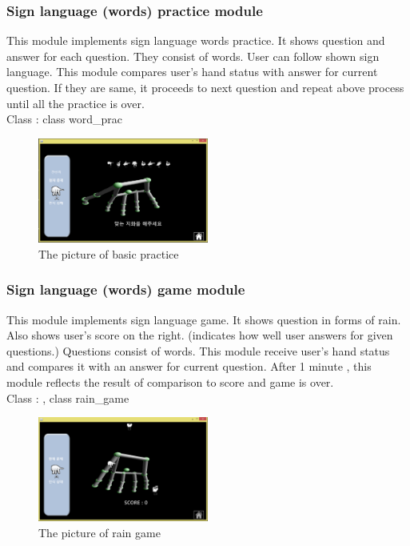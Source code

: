 \documentclass[10pt,journal,compsoc]{IEEEtran}
\begin{document}
\subsubsection{ Sign language (words) practice module\\}
This module implements sign language words practice. It shows question and answer for each question. They consist of words. User can follow shown sign language.  This module compares user’s hand status with answer for current question. If they are same, it proceeds to next question and repeat above process until all the practice is over.
\\Class : class word\_prac
\begin{figure}[H]
\centering
\includegraphics[width=0.5\textwidth]{cap_word_prac.png}
{\caption*{The picture of basic practice}}
\end{figure}
\subsubsection{Sign language (words) game module\\}
This module implements sign language game. It shows question in forms of rain. Also shows user’s score on the right. (indicates how well user answers for given questions.) Questions consist of words. This module receive user’s hand status and compares it with an answer for current question. After 1 minute , this module reflects the result of comparison to score and game is over.
\\Class : , class rain\_game
\begin{figure}[H]
\centering
\includegraphics[width=0.5\textwidth]{cap_rain_game.png}
{\caption*{The picture of rain game}}
\end{figure}
\end{document}
